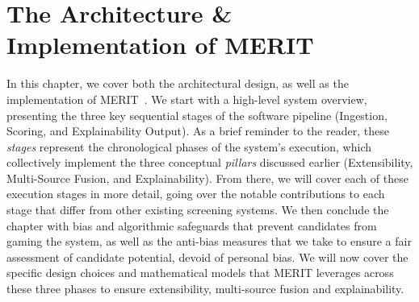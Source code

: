 \chapter{The Architecture \& Implementation of MERIT}
\label{ch:implementation}

In this chapter, we cover both the architectural design, as well as the implementation of MERIT~\cite{merit_repo}.
We start with a high-level system overview, presenting the three key sequential stages of the software pipeline 
(Ingestion, Scoring, and Explainability Output). As a brief reminder to the reader, these \textit{stages} represent 
the chronological phases of the system's execution, which collectively implement the three conceptual \textit{pillars} 
discussed earlier (Extensibility, Multi-Source Fusion, and Explainability).
From there, we will cover each of these execution stages in more detail, going over the notable contributions to each stage that
differ from other existing screening systems. We then conclude the chapter with bias and algorithmic safeguards
that prevent candidates from gaming the system, as well as the anti-bias measures that we take to ensure a fair assessment of 
candidate potential, devoid of personal bias. We will now cover the specific design choices and mathematical models that MERIT
leverages across these three phases to ensure extensibility, multi-source fusion and explainability.







